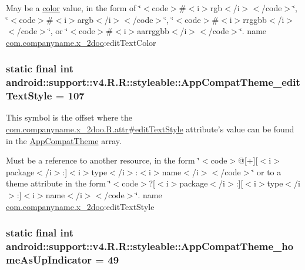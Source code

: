 May be a \hyperlink{classandroid_1_1support_1_1v4_1_1_r_1_1color}{color} value, in the form of \char`\"{}$<$code$>$\#$<$i$>$rgb$<$/i$>$$<$/code$>$\char`\"{}, \char`\"{}$<$code$>$\#$<$i$>$argb$<$/i$>$$<$/code$>$\char`\"{}, \char`\"{}$<$code$>$\#$<$i$>$rrggbb$<$/i$>$$<$/code$>$\char`\"{}, or \char`\"{}$<$code$>$\#$<$i$>$aarrggbb$<$/i$>$$<$/code$>$\char`\"{}.  name \hyperlink{namespacecom_1_1companyname_1_1x__2doo}{com.companyname.x\_\-2doo}:editTextColor \hypertarget{classandroid_1_1support_1_1v4_1_1_r_1_1styleable_be5ae2f20868c09eec22ffbecbfd4bd3}{
\subsubsection[{AppCompatTheme\_\-editTextStyle}]{\setlength{\rightskip}{0pt plus 5cm}static final int android::support::v4.R.R::styleable::AppCompatTheme\_\-editTextStyle = 107}}
\label{classandroid_1_1support_1_1v4_1_1_r_1_1styleable_be5ae2f20868c09eec22ffbecbfd4bd3}


This symbol is the offset where the \hyperlink{classcom_1_1companyname_1_1x__2doo_1_1_r_1_1attr_65b33de7ca942cb2f898a4f081f3314e}{com.companyname.x\_\-2doo.R.attr\#editTextStyle} attribute's value can be found in the \hyperlink{classandroid_1_1support_1_1v4_1_1_r_1_1styleable_0873e92ba21076bb5a4aeadeb7f5779f}{AppCompatTheme} array.

Must be a reference to another resource, in the form \char`\"{}$<$code$>$@\mbox{[}+\mbox{]}\mbox{[}$<$i$>$package$<$/i$>$:\mbox{]}$<$i$>$type$<$/i$>$:$<$i$>$name$<$/i$>$$<$/code$>$\char`\"{} or to a theme attribute in the form \char`\"{}$<$code$>$?\mbox{[}$<$i$>$package$<$/i$>$:\mbox{]}\mbox{[}$<$i$>$type$<$/i$>$:\mbox{]}$<$i$>$name$<$/i$>$$<$/code$>$\char`\"{}.  name \hyperlink{namespacecom_1_1companyname_1_1x__2doo}{com.companyname.x\_\-2doo}:editTextStyle \hypertarget{classandroid_1_1support_1_1v4_1_1_r_1_1styleable_760d4c63c4342ad1814a4021ddbaf121}{
\subsubsection[{AppCompatTheme\_\-homeAsUpIndicator}]{\setlength{\rightskip}{0pt plus 5cm}static final int android::support::v4.R.R::styleable::AppCompatTheme\_\-homeAsUpIndicator = 49}}
\label{classandroid_1_1support_1_1v4_1_1_r_1_1styleable_760d4c63c4342ad1814a4021ddbaf121}


